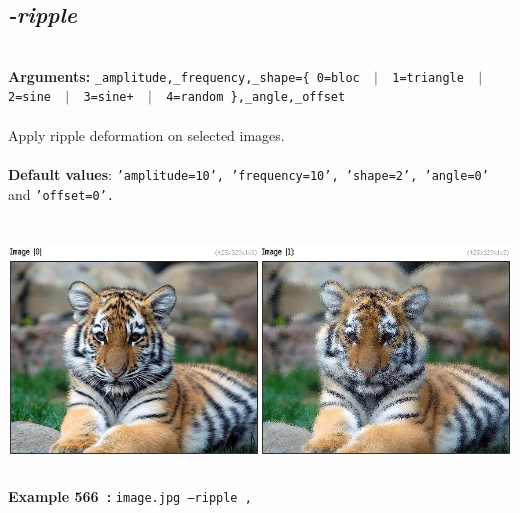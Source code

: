 \documentclass[a4paper,11pt,twoside]{book}
\begin{document}
\subsection{\emph{-ripple} }\vspace*{-0.5em}
~\\\textbf{Arguments: } 
{\small \texttt{\_amplitude,\_frequency,\_shape=\{ 0=bloc ~$|$~ 1=triangle ~$|$~ 2=sine ~$|$~ 3=sine+ ~$|$~ 4=random \},\_angle,\_offset}}\\~\\
Apply ripple deformation on selected images.
~\\~\\\textbf{Default values}: {\small \texttt{'amplitude=10', 'frequency=10', 'shape=2', 'angle=0'} and \texttt{'offset=0'.}}
\begin{center}\includegraphics[keepaspectratio=true,height=7cm,width=\textwidth]{img/gmic_def566.jpg}\\
{\footnotesize \textbf{Example 566~:} \texttt{image.jpg --ripple ,}}
\end{center}
\end{document}
